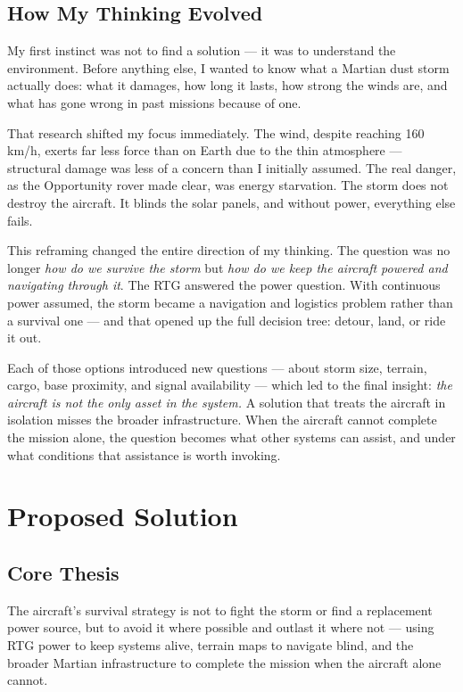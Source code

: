 \documentclass[a4paper,12pt]{article}
\begin{document}
\subsection{How My Thinking Evolved}
My first instinct was not to find a solution — it was to understand the environment. Before
anything else, I wanted to know what a Martian dust storm actually does: what it damages,
how long it lasts, how strong the winds are, and what has gone wrong in past missions because
of one.

That research shifted my focus immediately. The wind, despite reaching 160 km/h, exerts far
less force than on Earth due to the thin atmosphere — structural damage was less of a concern
than I initially assumed. The real danger, as the Opportunity rover made clear, was energy
starvation. The storm does not destroy the aircraft. It blinds the solar panels, and without
power, everything else fails.

This reframing changed the entire direction of my thinking. The question was no longer
\textit{how do we survive the storm} but \textit{how do we keep the aircraft powered and
navigating through it}. The RTG answered the power question. With continuous power assumed,
the storm became a navigation and logistics problem rather than a survival one — and that
opened up the full decision tree: detour, land, or ride it out.

Each of those options introduced new questions — about storm size, terrain, cargo, base
proximity, and signal availability — which led to the final insight: \textit{the aircraft is
not the only asset in the system.} A solution that treats the aircraft in isolation misses
the broader infrastructure. When the aircraft cannot complete the mission alone, the question
becomes what other systems can assist, and under what conditions that assistance is worth invoking.

\section{Proposed Solution}

\subsection{Core Thesis}
The aircraft's survival strategy is not to fight the storm or find a replacement power source,
but to avoid it where possible and outlast it where not — using RTG power to keep systems alive,
terrain maps to navigate blind, and the broader Martian infrastructure to complete the mission
when the aircraft alone cannot.
\end{document}
